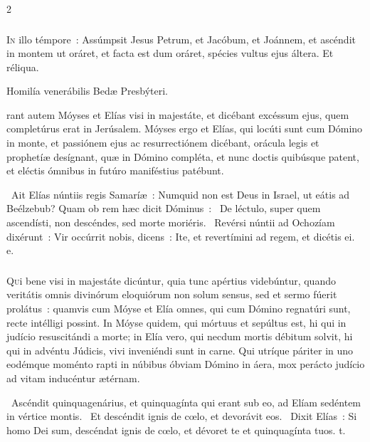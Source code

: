 \documentclass[9pt,twoside]{extarticle}
\begin{document}
\begin{multicols}{2}
{\subsubsection*{\center {}}
\lettrine{I}n illo témpore~: Assúmpsit Jesus Petrum, et Jacóbum, et Joánnem, et ascéndit in montem ut oráret, et facta est dum oráret, spécies vultus ejus áltera. Et réliqua. 

\begin{center}Homilía venerábilis Bedæ Presbýteri.\end{center}
rant autem Móyses et Elías visi in majestáte, et dicébant excéssum ejus, quem completúrus erat in Jerúsalem. Móyses ergo et Elías, qui locúti sunt cum Dómino in monte, et passiónem ejus ac resurrectiónem dicébant, orácula legis et prophetíæ desígnant, quæ in Dómino compléta, et nunc doctis quibúsque patent, et eléctis ómnibus in futúro maniféstius patébunt.

\begin{tightlist}{}
\item {}~Ait Elías núntiis regis Samaríæ~: Numquid non est Deus in Israel, ut eátis ad Beélzebub? Quam ob rem hæc dicit Dóminus~: \textred{*}~De léctulo, super quem ascendísti, non descéndes, sed morte moriéris. ~Revérsi núntii ad Ochozíam dixérunt~: Vir occúrrit nobis, dicens~: Ite, et revertímini ad regem, et dicétis ei. e.
\end{tightlist}

\subsubsection*{\center {}}
\lettrine{Q}ui bene visi in majestáte dicúntur, quia tunc apértius videbúntur, quando veritátis omnis divinórum eloquiórum non solum sensus, sed et sermo fúerit prolátus~: quamvis cum Móyse et Elía omnes, qui cum Dómino regnatúri sunt, recte intélligi possint. In Móyse quidem, qui mórtuus et sepúltus est, hi qui in judício resuscitándi a morte; in Elía vero, qui necdum mortis débitum solvit, hi qui in advéntu Júdicis, vivi inveniéndi sunt in carne. Qui utríque páriter in uno eodémque moménto rapti in núbibus óbviam Dómino in áera, mox perácto judício ad vitam inducéntur ætérnam.

\begin{tightlist}{}
\item {}~Ascéndit quinquagenárius, et quinquagínta qui erant sub eo, ad Elíam sedéntem in vértice montis. \textred{*}~Et descéndit ignis de cœlo, et devorávit eos. ~Dixit Elías~: Si homo Dei sum, descéndat ignis de cœlo, et dévoret te et quinquagínta tuos. t.
\end{tightlist}

}
\end{multicols}
\end{document}
